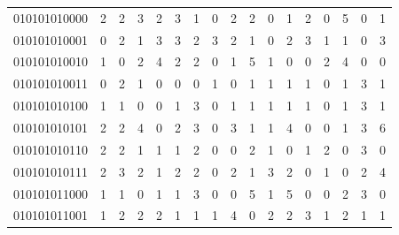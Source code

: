 \documentclass[10pt,a4paper]{article}
\begin{document}
\begin{longtable}{ |c|c|c|c|c|c|c|c|c|c|c|c|c|c|c|c|c| }
    010101010000              & 2                            & 2                                & 3                            & 2                              & 3   & 1   & 0   & 2   & 2   & 0   & 1   & 2   & 0   & 5   & 0   & 1   \\
    010101010001              & 0                            & 2                                & 1                            & 3                              & 3   & 2   & 3   & 2   & 1   & 0   & 2   & 3   & 1   & 1   & 0   & 3   \\
    010101010010              & 1                            & 0                                & 2                            & 4                              & 2   & 2   & 0   & 1   & 5   & 1   & 0   & 0   & 2   & 4   & 0   & 0   \\
    010101010011              & 0                            & 2                                & 1                            & 0                              & 0   & 0   & 1   & 0   & 1   & 1   & 1   & 1   & 0   & 1   & 3   & 1   \\
    010101010100              & 1                            & 1                                & 0                            & 0                              & 1   & 3   & 0   & 1   & 1   & 1   & 1   & 1   & 0   & 1   & 3   & 1   \\
    010101010101              & 2                            & 2                                & 4                            & 0                              & 2   & 3   & 0   & 3   & 1   & 1   & 4   & 0   & 0   & 1   & 3   & 6   \\
    010101010110              & 2                            & 2                                & 1                            & 1                              & 1   & 2   & 0   & 0   & 2   & 1   & 0   & 1   & 2   & 0   & 3   & 0   \\
    010101010111              & 2                            & 3                                & 2                            & 1                              & 2   & 2   & 0   & 2   & 1   & 3   & 2   & 0   & 1   & 0   & 2   & 4   \\
    010101011000              & 1                            & 1                                & 0                            & 1                              & 1   & 3   & 0   & 0   & 5   & 1   & 5   & 0   & 0   & 2   & 3   & 0   \\
    010101011001              & 1                            & 2                                & 2                            & 2                              & 1   & 1   & 1   & 4   & 0   & 2   & 2   & 3   & 1   & 2   & 1   & 1   \\

\end{longtable}
\end{document}
